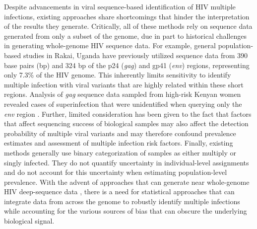 \documentclass[10pt,letterpaper]{article}
\begin{document}
Despite advancements in viral sequence-based identification of HIV multiple infections, existing approaches share shortcomings that hinder the interpretation of the results they generate. Critically, all of these methods rely on sequence data generated from only a subset of the genome, due in part to historical challenges in generating whole-genome HIV sequence data. For example, general population-based studies in Rakai, Uganda have previously utilized sequence data from 390 base pairs (bp) and 324 bp of the p24 (\textit{gag}) and gp41 (\textit{env}) regions, representing only 7.3\% of the HIV genome. This inherently limits sensitivity to identify multiple infection with viral variants that are highly related within these short regions. Analysis of \textit{gag} sequence data sampled from high-risk Kenyan women revealed cases of superinfection that were unidentified when querying only the \textit{env} region \cite{piantadosi2008}. Further, limited consideration has been given to the fact that factors that affect sequencing success of biological samples \cite{bonsall2020} may also affect the detection probability of multiple viral variants and may therefore confound prevalence estimates and assessment of multiple infection risk factors. Finally, existing methods generally use binary categorization of samples as either multiply or singly infected. They do not quantify uncertainty in individual-level assignments and do not account for this uncertainty when estimating population-level prevalence. With the advent of approaches that can generate near whole-genome HIV deep-sequence data \cite{gall2012, bonsall2020}, there is a need for statistical approaches that can integrate data from across the genome to robustly identify multiple infections while accounting for the various sources of bias that can obscure the underlying biological signal. \par
\end{document}
